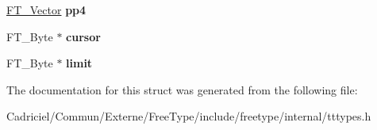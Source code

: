\begin{DoxyCompactItemize}
\item 
\hypertarget{struct_t_t___loader_rec___a0608203207c3fc735046b8baef4b9201}{\hyperlink{struct_f_t___vector__}{F\-T\-\_\-\-Vector} {\bfseries pp4}}\label{struct_t_t___loader_rec___a0608203207c3fc735046b8baef4b9201}

\item 
\hypertarget{struct_t_t___loader_rec___a6769a96f37ca22801f6199937cbe9ca7}{F\-T\-\_\-\-Byte $\ast$ {\bfseries cursor}}\label{struct_t_t___loader_rec___a6769a96f37ca22801f6199937cbe9ca7}

\item 
\hypertarget{struct_t_t___loader_rec___a1b07761e8ea436c38b4c42117a00a0ff}{F\-T\-\_\-\-Byte $\ast$ {\bfseries limit}}\label{struct_t_t___loader_rec___a1b07761e8ea436c38b4c42117a00a0ff}

\end{DoxyCompactItemize}


The documentation for this struct was generated from the following file\-:\begin{DoxyCompactItemize}
\item 
Cadriciel/\-Commun/\-Externe/\-Free\-Type/include/freetype/internal/tttypes.\-h\end{DoxyCompactItemize}
